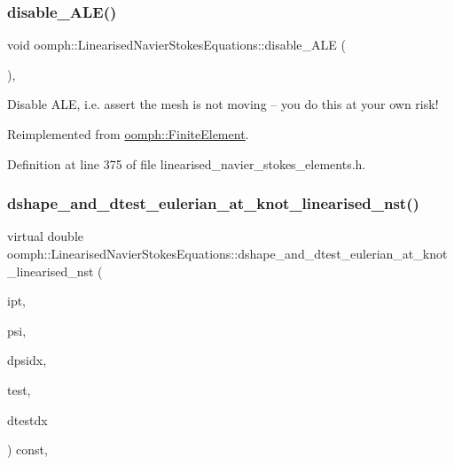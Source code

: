 \subsubsection{\texorpdfstring{disable\+\_\+\+A\+L\+E()}{disable\_ALE()}}
{\footnotesize\ttfamily void oomph\+::\+Linearised\+Navier\+Stokes\+Equations\+::disable\+\_\+\+A\+LE (\begin{DoxyParamCaption}{ }\end{DoxyParamCaption})\hspace{0.3cm}{\ttfamily [inline]}, {\ttfamily [virtual]}}



Disable A\+LE, i.\+e. assert the mesh is not moving -- you do this at your own risk! 



Reimplemented from \hyperlink{classoomph_1_1FiniteElement_a625ea6d3f9baccfbdd1323315fb3ec71}{oomph\+::\+Finite\+Element}.



Definition at line 375 of file linearised\+\_\+navier\+\_\+stokes\+\_\+elements.\+h.

\mbox{\label{classoomph_1_1LinearisedNavierStokesEquations_a87a2102128bc071afa16f2e950724ee3}} 
\subsubsection{\texorpdfstring{dshape\+\_\+and\+\_\+dtest\+\_\+eulerian\+\_\+at\+\_\+knot\+\_\+linearised\+\_\+nst()}{dshape\_and\_dtest\_eulerian\_at\_knot\_linearised\_nst()}}
{\footnotesize\ttfamily virtual double oomph\+::\+Linearised\+Navier\+Stokes\+Equations\+::dshape\+\_\+and\+\_\+dtest\+\_\+eulerian\+\_\+at\+\_\+knot\+\_\+linearised\+\_\+nst (\begin{DoxyParamCaption}\item[{const unsigned \&}]{ipt,  }\item[{\hyperlink{classoomph_1_1Shape}{Shape} \&}]{psi,  }\item[{\hyperlink{classoomph_1_1DShape}{D\+Shape} \&}]{dpsidx,  }\item[{\hyperlink{classoomph_1_1Shape}{Shape} \&}]{test,  }\item[{\hyperlink{classoomph_1_1DShape}{D\+Shape} \&}]{dtestdx }\end{DoxyParamCaption}) const\hspace{0.3cm}{\ttfamily [protected]}, {}}



